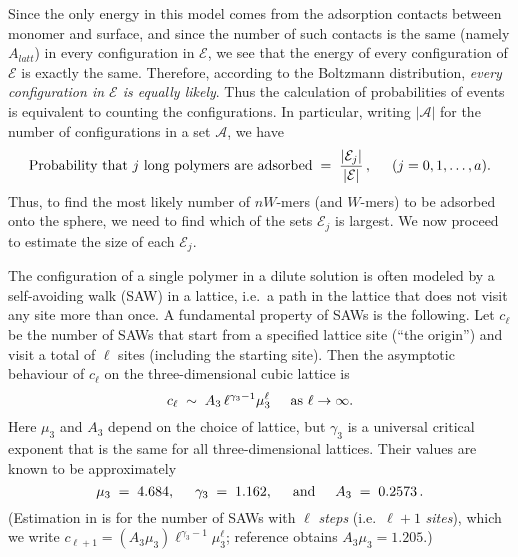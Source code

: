 \documentclass[12pt]{article}
\begin{document}
Since the only energy in this model comes from the adsorption contacts between monomer and surface,
and since the number of such contacts is the same (namely $A_{latt}$) in every configuration
in $\mathcal{E}$, we see that the energy of every configuration of $\mathcal{E}$ is exactly the same.
Therefore, according to the Boltzmann distribution, \textit{every configuration in $\mathcal{E}$ is equally
likely}.  Thus the calculation of probabilities of events is equivalent to counting the configurations.
In particular, writing $|\mathcal{A}|$ for the number of configurations in a set $\mathcal{A}$, we have
\[
    \hbox{Probability that $j$ long polymers are adsorbed}  \;=\; 
    \frac{|\mathcal{E}_j|}{|\mathcal{E}|}\,,   \hspace{5mm}(j=0,1,\ldots,a).
\]
Thus, to find the most likely number of $nW$-mers (and $W$-mers) to be adsorbed onto the sphere,
we need to find which of the sets $\mathcal{E}_j$ is largest.
We now proceed to estimate the size of each $\mathcal{E}_j$.

\smallskip

The configuration of a single  polymer in a dilute solution is often modeled by
a self-avoiding walk (SAW) in a lattice, i.e.\  a path in the lattice that does not visit any site more than once.
A fundamental property of SAWs is the following.  
Let $c_{\ell}$ be
the number of SAWs that start from a specified lattice site (``the origin'') and visit a total of $\ell$ sites
(including the starting site).   Then the 
asymptotic behaviour of $c_{\ell}$ on the three-dimensional cubic lattice is 
\begin{equation}
    \label{eq.sawscale}
       c_{\ell}  \;\sim  \;  A_3 \, {\ell}^{\gamma_3-1}  \mu_3^{\ell}    \hspace{5mm}\hbox{as $\ell\rightarrow\infty$}.
\end{equation}
Here $\mu_3$ and $A_3$ depend on the choice of lattice, but $\gamma_3$ is a universal critical exponent
that is the same for all three-dimensional lattices.  
Their values are known to be approximately \cite{CL,MS}
\begin{equation}
   \label{eq.gammas}   \mu_3 \;=\;  4.684, \hspace{5mm}
        \gamma_3 \;=\;  1.162,    \hspace{5mm}\hbox{and}\hspace{5mm}
    A_3  \;=\;    0.2573  \,.  %
\end{equation}
(Estimation in \cite{CL} is for the 
number of SAWs with $\ell$ \textit{steps} (i.e.\ $\ell+1$ \textit{sites}), which we write  $c_{\ell+1}=(A_3\mu_3)\ell^{\gamma_3-1}\mu_3^{\ell}$; reference \cite{CL} obtains $A_3\mu_3=1.205$.)
\end{document}
